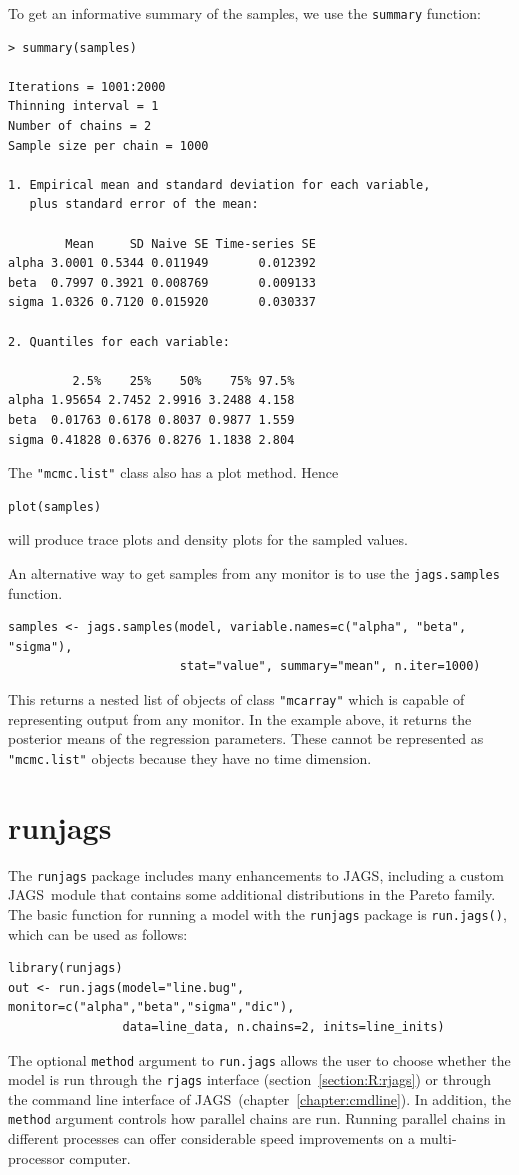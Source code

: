 \documentclass[11pt, a4paper, titlepage]{report}
\newcommand{\JAGS}{\textsf{JAGS}}
\begin{document}
To get an informative summary of the samples, we use the
\texttt{summary} function:
\begin{verbatim}
> summary(samples)

Iterations = 1001:2000
Thinning interval = 1 
Number of chains = 2 
Sample size per chain = 1000 

1. Empirical mean and standard deviation for each variable,
   plus standard error of the mean:

        Mean     SD Naive SE Time-series SE
alpha 3.0001 0.5344 0.011949       0.012392
beta  0.7997 0.3921 0.008769       0.009133
sigma 1.0326 0.7120 0.015920       0.030337

2. Quantiles for each variable:

         2.5%    25%    50%    75% 97.5%
alpha 1.95654 2.7452 2.9916 3.2488 4.158
beta  0.01763 0.6178 0.8037 0.9877 1.559
sigma 0.41828 0.6376 0.8276 1.1838 2.804
\end{verbatim}
The \texttt{"mcmc.list"} class also has a plot method. Hence
\begin{verbatim}
plot(samples)
\end{verbatim}
will produce trace plots and density plots for the sampled values.

An alternative way to get samples from any monitor is to use the
\texttt{jags.samples} function.
\begin{verbatim}
samples <- jags.samples(model, variable.names=c("alpha", "beta", "sigma"), 
                        stat="value", summary="mean", n.iter=1000)
\end{verbatim}
This returns a nested list of objects of class \texttt{"mcarray"} which
is capable of representing output from any monitor. In the example
above, it returns the posterior means of the regression parameters. These
cannot be represented as \texttt{"mcmc.list"} objects because they have
no time dimension.

\section{runjags}
\label{section:R:runjags}

The \texttt{runjags} package \citep{Denwood2016} includes many
enhancements to \JAGS, including a custom \JAGS\ module that contains
some additional distributions in the Pareto family. The basic function for 
running a model with the \texttt{runjags} package is \texttt{run.jags()}, 
which can be used as follows:
\begin{verbatim}
library(runjags)
out <- run.jags(model="line.bug", monitor=c("alpha","beta","sigma","dic"),
                data=line_data, n.chains=2, inits=line_inits)
\end{verbatim}
The optional \texttt{method} argument to \texttt{run.jags} allows the
user to choose whether the model is run through the \texttt{rjags}
interface (section~\ref{section:R:rjags}) or through the command line
interface of \JAGS\ (chapter~\ref{chapter:cmdline}). In addition, the
\texttt{method} argument controls how parallel chains are run. Running
parallel chains in different processes can offer considerable speed
improvements on a multi-processor computer.
\end{document}

